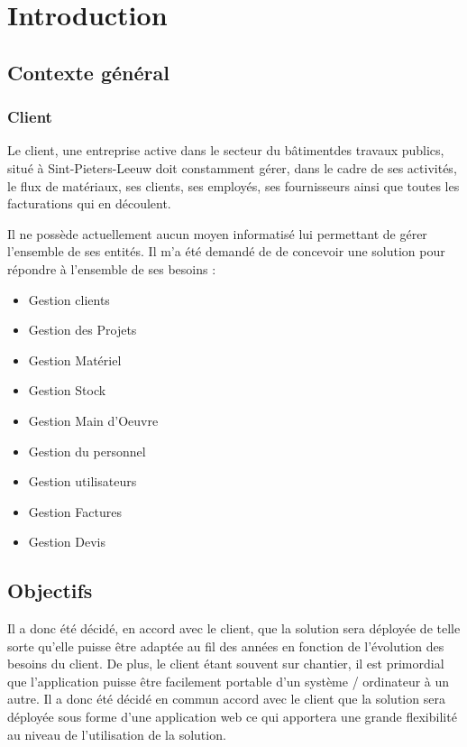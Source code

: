 \section{Introduction}
\subsection{Contexte général }
\subsubsection{Client}

Le client, une entreprise active dans le secteur du bâtimentdes travaux publics, situé à Sint-Pieters-Leeuw doit constamment gérer, dans le cadre de ses activités, le flux de matériaux, ses clients, ses employés, ses fournisseurs ainsi que toutes les facturations qui en découlent.

Il ne possède actuellement aucun moyen informatisé lui permettant de gérer l'ensemble de ses entités. Il m'a été demandé de de concevoir une solution pour répondre à l'ensemble de ses besoins :

\begin{itemize}
  \item Gestion clients 
  \item Gestion des Projets
  \item Gestion Matériel
  \item Gestion Stock
  \item Gestion Main d'Oeuvre
  \item Gestion du personnel
  \item Gestion utilisateurs
  \item Gestion Factures
  \item Gestion Devis

\end{itemize}

\subsection{Objectifs }

Il a donc été décidé, en accord avec le client, que la solution sera déployée de telle sorte qu'elle puisse être adaptée au fil des années en fonction de l'évolution des besoins du client. 
De plus, le client étant souvent sur chantier, il est primordial que l'application puisse être facilement portable d'un système / ordinateur à un autre. Il a donc été décidé en commun accord avec le client que la solution sera déployée sous forme d'une application web ce qui apportera une grande flexibilité au niveau de l'utilisation de la solution.

